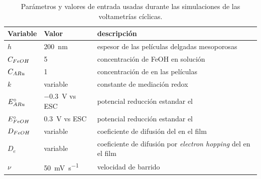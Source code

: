 	    	\begin{table}[ht!]
	 	    \caption[Parámetros de las simulacinoes]{Parámetros y valores de entrada usadas durante las simulaciones de las voltametrías cíclicas.}
	 	    \begin{tabular}{>{\raggedright\arraybackslash}m{1.4cm}>{\centering\arraybackslash}m{2.8cm}>{\raggedright\arraybackslash}m{6.7cm}} 
	 	    \toprule
	 	    Variable  & 	Valor  &   descripción      \\ \midrule
	 	    $h$  	  &    \SI{200}{nm}	& 	   espesor de las películas delgadas mesoporosas 	    \\ \midrule
	 	    $C_{\fc}$  & \SI{5}{\milli\Molar}  & concentración de FeOH en solución    \\ \midrule
	 	    $C_{\ru}$ & \SI{1}{\milli\Molar}  & concentración de \ru\space en las películas    \\ \midrule
	 	    $k$ 		   & variable 	 & 	constante de mediación redox    \\ \midrule
	 	    $E^\circ_{\ru}$  & \SI{-0.3}{\volt} vs ESC & potencial reducción estandar el \ru \\ \midrule
	 	    $E^\circ_{\fc}$  & \SI{0.3}{\volt} vs ESC & potencial reducción estandar el \fc \\ \midrule
	 	    $D_{\fc}$  & variable & coeficiente de difusión del \fc\space en el film \\ \midrule
	 	    $D_{e}$  & variable & coeficiente de difusión por \textit{electron hopping }del \ru\space en el film \\ \midrule
	 	    $\nu$    & \SI{50}{\milli\volt\per\second}  &  velocidad de barrido \\
	 	     \bottomrule
			\end{tabular}
			\label{tabla:simulacion}
			\end{table} 

